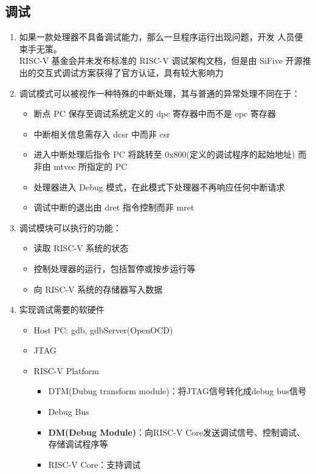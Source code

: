 \documentclass{article}
\begin{document}
\subsection{调试}
\begin{enumerate}
  \item 如果一款处理器不具备调试能力，那么一旦程序运行出现问题，开发 人员便束手无策。\\
    RISC-V 基金会并未发布标准的 RISC-V 调试架构文档，但是由 SiFive 开源推出的交互式调试方案获得了官方认证，具有较大影响力\cite{riscv1}
  \item 调试模式可以被视作一种特殊的中断处理，其与普通的异常处理不同在于：
    \begin{itemize}
      \item 断点 PC 保存至调试系统定义的 dpc 寄存器中而不是 epc 寄存器
      \item 中断相关信息需存入 dcsr 中而非 csr
      \item 进入中断处理后指令 PC 将跳转至 0x800(定义的调试程序的起始地址) 而非由 mtvec 所指定的 PC
      \item 处理器进入 Debug 模式，在此模式下处理器不再响应任何中断请求
      \item 调试中断的退出由 dret 指令控制而非 mret
    \end{itemize}
  \item 调试模块可以执行的功能：
    \begin{itemize}
      \item 读取 RISC-V 系统的状态
      \item 控制处理器的运行，包括暂停或按步运行等
      \item 向 RISC-V 系统的存储器写入数据
    \end{itemize}
  \item 实现调试需要的软硬件
    \begin{itemize}
      \item Host PC: gdb, gdbServer(OpenOCD)
      \item JTAG
      \item RISC-V Platform
        \begin{itemize}
          \item DTM(Dubug transform module)：将JTAG信号转化成debug bus信号
          \item Debug Bus
          \item \textbf{DM(Debug Module)}：向RISC-V Core发送调试信号、控制调试、存储调试程序等
          \item RISC-V Core：支持调试
        \end{itemize}
    \end{itemize}
\end{enumerate}
\end{document}
